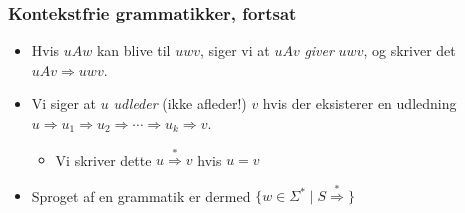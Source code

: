 \begin{frame}
	\frametitle{Kontekstfrie grammatikker, fortsat}

	\begin{itemize}
		\item Hvis $uAw$ kan blive til $uwv$, siger vi at $uAv$ \textit{giver} $uwv$, og skriver det $uAv \Rightarrow uwv$.
		\item Vi siger at $u$ \textit{udleder} (ikke afleder!) $v$ hvis der eksisterer en udledning $u \Rightarrow u_{1} \Rightarrow u_{2} \Rightarrow \cdots \Rightarrow u_{k} \Rightarrow v$.
		      \begin{itemize}
			      \item Vi skriver dette $u \overset{*}{\Rightarrow} v$ hvis $u = v$
		      \end{itemize}
		\item Sproget af en grammatik er dermed $\{w \in \Sigma^{*} \mid S \overset{*}{\Rightarrow}\}$
	\end{itemize}
\end{frame}


